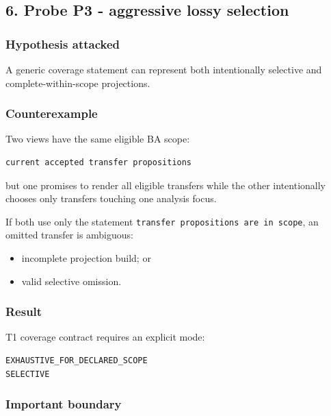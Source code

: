 \documentclass[11pt,a4paper]{article}
\providecommand{\tightlist}{\setlength{\itemsep}{0pt}\setlength{\parskip}{0pt}}
\begin{document}
\subsection{6. Probe P3 - aggressive lossy
selection}\label{6-probe-p3---aggressive-lossy-selection}

\subsubsection{Hypothesis attacked}\label{hypothesis-attacked-2}

A generic coverage statement can represent both intentionally selective
and complete-within-scope projections.

\subsubsection{Counterexample}\label{counterexample-1}

Two views have the same eligible BA scope:

\begin{verbatim}
current accepted transfer propositions
\end{verbatim}

but one promises to render all eligible transfers while the other
intentionally chooses only transfers touching one analysis focus.

If both use only the statement
\texttt{transfer\ propositions\ are\ in\ scope}, an omitted transfer is
ambiguous:

\begin{itemize}
\tightlist
\item
  incomplete projection build; or
\item
  valid selective omission.
\end{itemize}

\subsubsection{Result}\label{result-2}

T1 coverage contract requires an explicit mode:

\begin{verbatim}
EXHAUSTIVE_FOR_DECLARED_SCOPE
SELECTIVE
\end{verbatim}

\subsubsection{Important boundary}\label{important-boundary}
\end{document}
